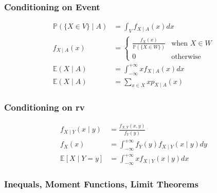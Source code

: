 \documentclass[10pt]{article}
\begin{document}
\begin{multicols}{2}
\subsubsection*{Conditioning on Event}

\begin{equation*}
  \boxed{
    \begin{aligned}
      \mathbb{P}(\{X\in V\}\mid A) &= \int_V f_{X\mid A}(x) dx \\
      f_{X\mid A}(x) &=
      \begin{cases}
        \frac{f_X(x)} {\mathbb{P}(\{X\in W\})} & \text{when } X\in W \\
        0 & \text{otherwise}
      \end{cases} \\
      \mathbb{E}(X \mid A) &= \int_{-\infty}^{+\infty} xf_{X\mid A}(x)dx \\
      \mathbb{E}(X \mid A) &= \sum_{x\in X} xp_{X\mid A}(x)
    \end{aligned}
  }
\end{equation*}

\subsubsection*{Conditioning on rv}

\begin{equation*}
  \boxed{
    \begin{aligned}
      f_{X\mid Y}(x\mid y) &= \frac{f_{X,Y}(x,y)}{f_Y(y)} \\
      f_X(x) &= \int_{-\infty}^{+\infty} f_Y(y)f_{X\mid Y}(x\mid y) dy \\
      \mathbb{E}[X\mid Y=y] &= \int_{-\infty}^{+\infty} xf_{X\mid Y}(x\mid y) dx
    \end{aligned}
  }
\end{equation*}
\end{multicols}

\subsubsection*{Inequals, Moment Functions, Limit Theorems}
\end{document}
